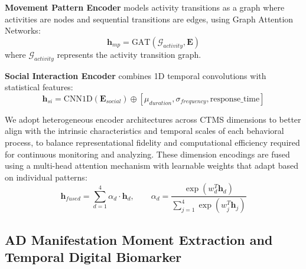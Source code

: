 \documentclass[sigconf, anonymous, 9pt, nonacm]{acmart}
\begin{document}
\noindent\textbf{Movement Pattern Encoder} models activity transitions as a graph where activities are nodes and sequential transitions are edges, using Graph Attention Networks:
\begin{equation*}
\mathbf{h}_{mp} = \text{GAT}(\mathcal{G}_{activity}, \mathbf{E})
\end{equation*}
where $\mathcal{G}_{activity}$ represents the activity transition graph.

\noindent\textbf{Social Interaction Encoder} combines 1D temporal convolutions with statistical features:
\begin{equation*}
\mathbf{h}_{si} = \text{CNN1D}(\mathbf{E}_{social}) \oplus [\mu_{duration}, \sigma_{frequency}, \text{response\_time}]
\end{equation*}

We adopt heterogeneous encoder architectures across CTMS dimensions to better align with the intrinsic characteristics and temporal scales of each behavioral process, to balance representational fidelity and computational efficiency required for continuous monitoring and analyzing.
These dimension encodings are fused using a multi-head attention mechanism with learnable weights that adapt based on individual patterns:
\begin{equation*}
\mathbf{h}_{fused} = \sum_{d=1}^{4} \alpha_d \cdot \mathbf{h}_d, \hspace{2em}
\alpha_d = \frac{\exp(w_d^T\mathbf{h}_d)}{\sum_{j=1}^{4}\exp(w_j^T\mathbf{h}_j)}
\end{equation*}


\subsection{AD Manifestation Moment Extraction and Temporal Digital Biomarker}
\end{document}
